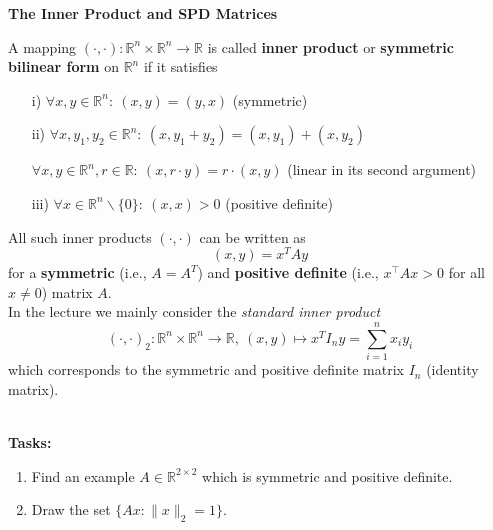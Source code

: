 \textbf{The Inner Product and SPD Matrices}
{\color{navy} A mapping $(\cdot,\cdot)\colon \mathbb{R}^n\times \mathbb{R}^n \to \mathbb{R}$ is called \textbf{inner product} or \textbf{symmetric bilinear form} on $\mathbb{R}^n$ if it satisfies
\begin{itemize}
	\item[i)] $\forall x,y \in \mathbb{R}^n: ~(x,y) = (y,x)$ \hspace{3.6cm} (symmetric)
	\item[ii)] $\forall x,y_1,y_2 \in \mathbb{R}^n: ~(x,y_1+y_2) = (x,y_1)+(x,y_2)$
	\item[] $\forall x,y \in \mathbb{R}^n, r \in \mathbb{R}: ~ (x,r\cdot y)=r\cdot(x,y)$ \hspace{1.8cm} (linear in its second argument)
	\item[iii)]$\forall x \in \mathbb{R}^n\backslash\{0\}: ~ (x,x) > 0$\hspace{3.9cm}  (positive definite)
\end{itemize}
All such inner products $(\cdot,\cdot)$  can be written as 
$$(x,y) = x^T A y $$
for a \textbf{symmetric} (i.e., $A = A^T$) and \textbf{positive definite} (i.e., $x^\top Ax>0$ for all $x\neq 0$) matrix $A$.
~\\
In the lecture we mainly consider the \textit{standard inner product} $$(\cdot,\cdot)_2\colon \mathbb{R}^n\times \mathbb{R}^n \to \mathbb{R},~ (x,y) \mapsto x^TI_ny=\sum_{i=1}^n x_i y_i$$ which corresponds to the symmetric and positive definite matrix $I_n$ (identity matrix).
}

%





~\\
\textbf{Tasks:}
\begin{enumerate}
	\item Find an example $A \in \mathbb{R}^{2 \times 2}$ which is symmetric and positive definite.
	\item Draw the set $\{ Ax\colon \|x\|_2 = 1\}$.
\end{enumerate}



